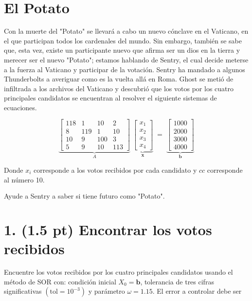 \section{El Potato}

Con la muerte del "Potato" se llevará a cabo un nuevo cónclave en el Vaticano, en el que participan todos los cardenales  del mundo. Sin embargo, también se sabe que, esta vez, existe un participante nuevo que afirma ser un dios en la tierra y merecer ser el nuevo "Potato"; estamos hablando de Sentry, el cual decide meterse a la fuerza al Vaticano y participar de la votación. Sentry ha mandado a algunos Thunderbolts a averiguar como es la vuelta allá en Roma. Ghost se metió de infiltrada a los archivos del Vaticano y descubrió que los votos por los cuatro principales candidatos se encuentran al resolver el siguiente sistemas de ecuaciones.

\[
\underbrace{\begin{bmatrix}
118 &  1 & 10 &  2\\
  8 & 119 &  1 & 10\\
10 &  9 & 100 & 3\\
  5 &  9 & 10 & 113
\end{bmatrix}}_{A}
\;
\underbrace{\begin{bmatrix}
x_1\\ x_2\\ x_3\\ x_4
\end{bmatrix}}_{\mathbf{x}}
\;=\;
\underbrace{\begin{bmatrix}
1000\\ 2000\\ 3000\\ 4000
\end{bmatrix}}_{\mathbf{b}}
\]


Donde $x_i$ corresponde a los votos recibidos por cada candidato y $cc$
corresponde al número 10.

Ayude a Sentry a saber si tiene futuro como "Potato".

\section{1. (1.5 pt) Encontrar los votos recibidos}

Encuentre los votos recibidos por los cuatro principales candidatos usando el
método de SOR con: condición inicial \(X_0=\mathbf b\), tolerancia de
tres cifras significativas \((\text{tol}=10^{-3})\) y parámetro
\(\omega = 1.15\).  El error a controlar debe ser

